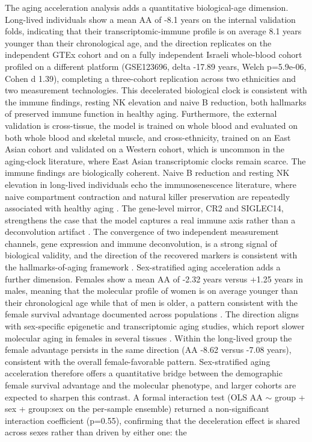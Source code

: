 \documentclass[11pt,a4paper]{article}
\begin{document}
The aging acceleration analysis adds a quantitative biological-age dimension. Long-lived individuals show a mean AA of -8.1 years on the internal validation folds, indicating that their transcriptomic-immune profile is on average 8.1 years younger than their chronological age, and the direction replicates on the independent GTEx cohort and on a fully independent Israeli whole-blood cohort profiled on a different platform (GSE123696, delta -17.89 years, Welch p=5.9e-06, Cohen d 1.39), completing a three-cohort replication across two ethnicities and two measurement technologies. This decelerated biological clock is consistent with the immune findings, resting NK elevation and naive B reduction, both hallmarks of preserved immune function in healthy aging. Furthermore, the external validation is cross-tissue, the model is trained on whole blood and evaluated on both whole blood and skeletal muscle, and cross-ethnicity, trained on an East Asian cohort and validated on a Western cohort, which is uncommon in the aging-clock literature, where East Asian transcriptomic clocks remain scarce. The immune findings are biologically coherent. Naive B reduction and resting NK elevation in long-lived individuals echo the immunosenescence literature, where naive compartment contraction and natural killer preservation are repeatedly associated with healthy aging \cite{franceschi2018inflammaging,goronzy2017fifty,fulop2018immunosenescence,grubeck2017human,pinti2017centenarian,wang2025immune,dato_2019,villeda_2011,kowalczyk_2014,adrover2019neutrophil,campos2014natural,chen2019age,fulop2004neutrophil,pararasa2015neutrophil,rubtsov2011toll,tseng2012neutrophil,aizawa_1980}. The gene-level mirror, CR2 and SIGLEC14, strengthens the case that the model captures a real immune axis rather than a deconvolution artifact \cite{hashimoto2019single,kamada2020single,wu2024immune,liu2025longevity}. The convergence of two independent measurement channels, gene expression and immune deconvolution, is a strong signal of biological validity, and the direction of the recovered markers is consistent with the hallmarks-of-aging framework \cite{lopez2013hallmarks,lopez2023hallmarks}. Sex-stratified aging acceleration adds a further dimension. Females show a mean AA of -2.32 years versus +1.25 years in males, meaning that the molecular profile of women is on average younger than their chronological age while that of men is older, a pattern consistent with the female survival advantage documented across populations \cite{austad_2006}. The direction aligns with sex-specific epigenetic and transcriptomic aging studies, which report slower molecular aging in females in several tissues \cite{hagg_2021}. Within the long-lived group the female advantage persists in the same direction (AA -8.62 versus -7.08 years), consistent with the overall female-favorable pattern. Sex-stratified aging acceleration therefore offers a quantitative bridge between the demographic female survival advantage and the molecular phenotype, and larger cohorts are expected to sharpen this contrast. A formal interaction test (OLS AA $\sim$ group + sex + group:sex on the per-sample ensemble) returned a non-significant interaction coefficient (p=0.55), confirming that the deceleration effect is shared across sexes rather than driven by either one: the 
\end{document}

